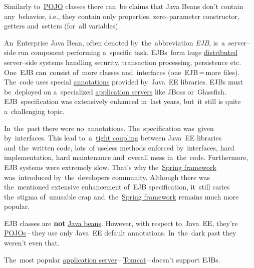 \newline\warning Similarly to~\hyperref[pojo]{POJO} classes there can~be claims that Java Beans don't contain any~behavior, i.e., they contain only properties, zero--parameter constructor, getters and~setters (for~all variables).

\label{enterprisejavabeans}
An~Enterprise Java Bean, often denoted by~the~abbreviation \textit{EJB}, is~a~server--side run component performing a~specific task. EJBs~form huge \hyperref[distributedsystem]{distributed} server--side systems handling security, transaction processing, persistence etc. One~EJB can~consist of~more classes and~interfaces (one~EJB\,=\,more files). The~code uses special \hyperref[annotations]{annotations} provided by~Java~EE libraries. EJBs must be~deployed on a~specialized \hyperref[applicationserver]{application servers} like JBoss or~Glassfish. EJB~specification was extensively enhanced in~last years, but~it still is quite a~challenging topic.

In~the~past there were no~annotations. The~specification was~given by~interfaces. This lead to~a~\hyperref[loosetightcoupling]{tight coupling} between Java~EE libraries and~the~written code, lots~of useless methods enforced by~interfaces, hard implementation, hard maintenance and~overall mess in~the~code. Furthermore, EJB systems were extremely slow. That's why the~\hyperref[springframework]{Spring framework} was~introduced by~the~developers community. Although there was the~mentioned extensive enhancement of~EJB specification, it~still caries the~stigma of~unusable crap and~the~\hyperref[springframework]{Spring framework} remains much more popular.

\newline\warning EJB classes are \textbf{not} \hyperref[javabeans]{Java beans}. However, with respect to~Java~EE, they're \hyperref[pojo]{POJOs}\,--\,they use only Java~EE default annotations. In~the~dark past they weren't even that.

\newline\warning The~most popular \hyperref[applicationserver]{application server}\,--\,\hyperref[tomcat]{Tomcat}\,--\,doesn't support EJBs.



\label{classpath}

\label{classloaders}




